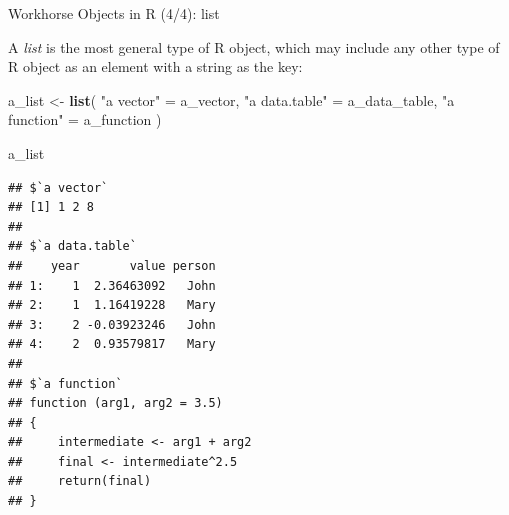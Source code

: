 \documentclass[10pt,ignorenonframetext,]{beamer}
\newenvironment{Shaded}{\begin{snugshade}}{\end{snugshade}}
\newcommand{\KeywordTok}[1]{\textcolor[rgb]{0.13,0.29,0.53}{\textbf{{#1}}}}
\newcommand{\StringTok}[1]{\textcolor[rgb]{0.31,0.60,0.02}{{#1}}}
\newcommand{\NormalTok}[1]{{#1}}
\begin{document}
\begin{frame}[fragile]{Workhorse Objects in R (4/4): list}

A \emph{list} is the most general type of R object, which may include
any other type of R object as an element with a string as the key:

\tiny

\begin{Shaded}
\begin{Highlighting}[]
\NormalTok{a_list <-}\StringTok{ }\KeywordTok{list}\NormalTok{(}
  \StringTok{"a vector"} \NormalTok{=}\StringTok{ }\NormalTok{a_vector,}
  \StringTok{"a data.table"} \NormalTok{=}\StringTok{ }\NormalTok{a_data_table,}
  \StringTok{"a function"} \NormalTok{=}\StringTok{ }\NormalTok{a_function}
\NormalTok{)}

\NormalTok{a_list}
\end{Highlighting}
\end{Shaded}

\begin{verbatim}
## $`a vector`
## [1] 1 2 8
## 
## $`a data.table`
##    year       value person
## 1:    1  2.36463092   John
## 2:    1  1.16419228   Mary
## 3:    2 -0.03923246   John
## 4:    2  0.93579817   Mary
## 
## $`a function`
## function (arg1, arg2 = 3.5) 
## {
##     intermediate <- arg1 + arg2
##     final <- intermediate^2.5
##     return(final)
## }
\end{verbatim}

\normalsize

\end{frame}
\end{document}
